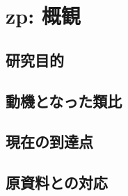 
\section{zp: 概観}

\subsection{研究目的}

\subsection{動機となった類比}

\subsection{現在の到達点}

\subsection{原資料との対応}
